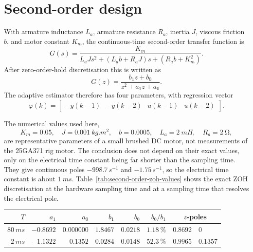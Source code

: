 \section{Second-order design}\label{sec:second-order}

With armature inductance \(L_a\), armature resistance \(R_a\), inertia \(J\),
viscous friction \(b\), and motor constant \(K_m\), the continuous-time
second-order transfer function is
\begin{equation}
  G(s)=
  \frac{K_m}
       {L_aJs^2+\left(L_ab+R_aJ\right)s+\left(R_ab+K_m^2\right)} .
  \label{eq:second-order-continuous-transfer}
\end{equation}
After zero-order-hold discretisation this is written as
\begin{equation}
  G(z)=\frac{b_1z+b_0}{z^2+a_1z+a_0}.
  \label{eq:second-order-discrete-transfer}
\end{equation}
The adaptive estimator therefore has four parameters, with regression vector
\begin{equation}
  \varphi(k)=
  \begin{bmatrix}
    -y(k-1) & -y(k-2) & u(k-1) & u(k-2)
  \end{bmatrix}.
  \label{eq:second-order-regressor}
\end{equation}

The numerical values used here,
\[
  K_m=0.05,\quad
  J=\SI{0.001}{kg.m^2},\quad
  b=0.0005,\quad
  L_a=\SI{2}{mH},\quad
  R_a=\SI{2}{\ohm},
\]
are representative parameters of a small brushed DC motor, not measurements of
the 25GA371 rig motor. The conclusion does not depend on their exact values,
only on the electrical time constant being far shorter than the sampling time.
They give continuous poles \(-998.7\,\si{s^{-1}}\) and
\(-1.75\,\si{s^{-1}}\), so the electrical time constant is about
\(\SI{1}{ms}\). Table~\ref{tab:second-order-zoh-values} shows the exact ZOH
discretisation at the hardware sampling time and at a sampling time that
resolves the electrical pole.

\begin{scripttable}
  \centering
  \caption{Exact ZOH parameters of the second-order motor model.}
  \label{tab:second-order-zoh-values}
  \begin{tabular}{rrrrrrrl}
    \toprule
    \(T\) & \(a_1\) & \(a_0\) & \(b_1\) & \(b_0\) &
    \(b_0/b_1\) & \multicolumn{2}{c}{\(z\)-poles} \\
    \midrule
    \(\SI{80}{ms}\) & \(-0.8692\) & \(0.000000\) & \(1.8467\) &
    \(0.0218\) & \(\SI{1.18}{\percent}\) & \(0.8692\) & \(0\) \\
    \(\SI{2}{ms}\)  & \(-1.1322\) & \(0.1352\)   & \(0.0284\) &
    \(0.0148\) & \(\SI{52.3}{\percent}\) & \(0.9965\) & \(0.1357\) \\
    \bottomrule
  \end{tabular}
\end{scripttable}

